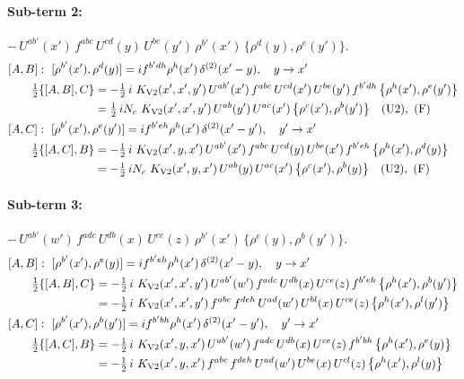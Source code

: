 \documentclass[10pt]{article}
\numberwithin{equation}{section}
\begin{document}
\paragraph{Sub-term 2:} $-\,U^{ab'}(x')\,f^{abc}\,U^{cd}(y)\,U^{be}(y')\,\rho^{b'}(x')\,\big\{\rho^{d}(y),\rho^{e}(y')\big\}$.
\begin{align}
&[A,B]:\ [\rho^{b'}(x'),\rho^{d}(y)]=i f^{b'dh}\rho^{h}(x')\,\delta^{(2)}(x'-y),\quad y\to x'\notag\\
&\qquad \tfrac12\{[A,B],C\}=-\tfrac12\,i\,\,K_{\rm V2}(x',x',y')\,U^{ab'}(x')\,f^{abc}\,U^{cd}(x')\,U^{be}(y')\,f^{b'dh}\,\big\{\rho^{h}(x'),\rho^{e}(y')\big\}\notag\\
&\qquad\phantom{\tfrac12\{[A,B],C\}}=\tfrac12\,i N_{c}\,\,K_{\rm V2}(x',x',y')\,U^{ab}(y')\,U^{ac}(x')\,\big\{\rho^{c}(x'),\rho^{b}(y')\big\}\quad\text{(U2)},\ \text{(F)}
\label{eq:GI.V2-2-AB}\\
&[A,C]:\ [\rho^{b'}(x'),\rho^{e}(y')]=i f^{b'eh}\rho^{h}(x')\,\delta^{(2)}(x'-y'),\quad y'\to x'\notag\\
&\qquad \tfrac12\{[A,C],B\}=-\tfrac12\,i\,\,K_{\rm V2}(x',y,x')\,U^{ab'}(x')\,f^{abc}\,U^{cd}(y)\,U^{be}(x')\,f^{b'eh}\,\big\{\rho^{h}(x'),\rho^{d}(y)\big\}\notag\\
&\qquad\phantom{\tfrac12\{[A,C],B\}}=-\tfrac12\,i N_{c}\,\,K_{\rm V2}(x',y,x')\,U^{ab}(y)\,U^{ac}(x')\,\big\{\rho^{c}(x'),\rho^{b}(y)\big\}\quad\text{(U2)},\ \text{(F)}
\label{eq:GI.V2-2-AC}
\end{align}
\paragraph{Sub-term 3:} $-\,U^{ab'}(w')\,f^{adc}\,U^{db}(x)\,U^{ce}(z)\,\rho^{b'}(x')\,\big\{\rho^{e}(y),\rho^{b}(y')\big\}$.
\begin{align}
&[A,B]:\ [\rho^{b'}(x'),\rho^{e}(y)]=i f^{b'eh}\rho^{h}(x')\,\delta^{(2)}(x'-y),\quad y\to x'\notag\\
&\qquad \tfrac12\{[A,B],C\}=-\tfrac12\,i\,\,K_{\rm V2}(x',x',y')\,U^{ab'}(w')\,f^{adc}\,U^{db}(x)\,U^{ce}(z)\,f^{b'eh}\,\big\{\rho^{h}(x'),\rho^{b}(y')\big\}\notag\\
&\qquad\phantom{\tfrac12\{[A,B],C\}}=-\tfrac12\,i\,\,K_{\rm V2}(x',x',y')\,f^{abc}\,f^{deh}\,U^{ad}(w')\,U^{bl}(x)\,U^{ce}(z)\,\big\{\rho^{h}(x'),\rho^{l}(y')\big\}
\label{eq:GI.V2-3-AB}\\
&[A,C]:\ [\rho^{b'}(x'),\rho^{b}(y')]=i f^{b'bh}\rho^{h}(x')\,\delta^{(2)}(x'-y'),\quad y'\to x'\notag\\
&\qquad \tfrac12\{[A,C],B\}=-\tfrac12\,i\,\,K_{\rm V2}(x',y,x')\,U^{ab'}(w')\,f^{adc}\,U^{db}(x)\,U^{ce}(z)\,f^{b'bh}\,\big\{\rho^{h}(x'),\rho^{e}(y)\big\}\notag\\
&\qquad\phantom{\tfrac12\{[A,C],B\}}=-\tfrac12\,i\,\,K_{\rm V2}(x',y,x')\,f^{abc}\,f^{deh}\,U^{ad}(w')\,U^{be}(x)\,U^{cl}(z)\,\big\{\rho^{h}(x'),\rho^{l}(y)\big\}
\label{eq:GI.V2-3-AC}
\end{align}
\end{document}
